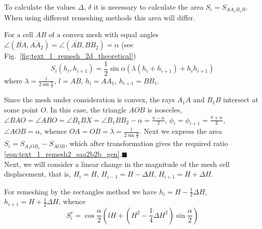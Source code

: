 \documentclass[
11pt,%
tightenlines,%
twoside,%
onecolumn,%
nofloats,%
nobibnotes,%
nofootinbib,%
superscriptaddress,%
noshowpacs,%
centertags]%
{revtex4}
\begin{document}
To calculate the values $\Delta$, $\delta$ it is necessary to calculate the area $S_i = S_{AA_1B_1B}$.
When using different remeshing methods this area will differ.

\begin{lemma}\label{lem:text_1_remesh2_vypukl_lemma}
For a cell $AB$ of a convex mesh with equal angles $\angle (\overline{BA}, \overline{AA_2}) = \angle (\overline{AB}, \overline{BB_2}) = \alpha$ (see Fig.~\ref{fig:text_1_remesh_2d_theoretical})
\begin{equation}\label{eqn:text_1_remesh2_saa2b2b_gen}
S_i(h_i, h_{i + 1}) = \frac{1}{2} \sin \alpha \left( \lambda(h_i + h_{i+1}) + h_ih_{i+1} \right)
\end{equation}
where $\lambda = \frac{l}{2 \sin \frac{\alpha}{2}}$, $l = AB$, $h_i = AA_1$, $h_{i + 1} = BB_1$.
\end{lemma}

Since the mesh under consideration is convex, the rays $A_1A$ and $B_1B$ intersect at some point $O$.
In this case, the triangle $AOB$ is isosceles, $\angle BAO = \angle ABO = \angle B_1BX = \angle B_1BB_2 - \alpha = \frac{\pi - \alpha}{2}$, $\phi_i = \phi_{i + 1} = \frac{\pi + \alpha}{2}$, $\angle AOB = \alpha$, whence $OA = OB = \lambda = \frac{l}{2 \sin \frac{\alpha}{2}}$.
Next we express the area $S_i = S_{A_1OB_1} - S_{AOB}$, which after transformation gives the required ratio \eqref{eqn:text_1_remesh2_saa2b2b_gen}.$\blacksquare$\\

Next, we will consider a linear change in the magnitude of the mesh cell displacement, that is, $H_i = H$, $H_{i - 1} = H - \Delta H$, $H_{i + 1} = H + \Delta H$.

For remeshing by the rectangles method we have $h_i = H - \frac{1}{2} \Delta H$, $h_{i + 1} = H + \frac{1}{2} \Delta H$, whence
\begin{equation}\label{eqn:text_1_remesh2_s_rect}
	S_i^r = \cos \frac{\alpha}{2} \left( lH + \left( H^2 - \frac{1}{4} \Delta H^2 \right) \sin \frac{\alpha}{2} \right)
\end{equation}
\end{document}
